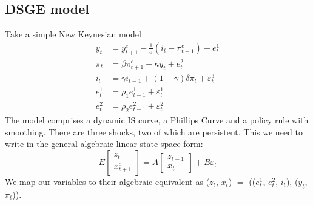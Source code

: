 \documentclass[
  letterpaper,
]{book}
\begin{document}
\hypertarget{dsge-model}{%
\subsection{DSGE model}\label{dsge-model}}

Take a simple New Keynesian model \begin{align}
y_t    &= y_{t+1}^e-\frac{1}{\sigma} (i_t - \pi_{t+1}^e) + e_t^1 \\
\pi_t  &= \beta \pi_{t+1}^e + \kappa y_t + e_t^2 \\
i_t    &= \gamma i_{t-1} + (1-\gamma) \delta \pi_t + \varepsilon_t^3 \\ 
e_t^1  &= \rho_1 e_{t-1}^1 + \varepsilon_t^1 \\ 
e_t^2  &= \rho_2 e_{t-1}^2 + \varepsilon_t^2 
\end{align} The model comprises a dynamic IS curve, a Phillips Curve and
a policy rule with smoothing. There are three shocks, two of which are
persistent. This we need to write in the general algebraic linear
state-space form: \[
E\begin{bmatrix} z_t \\ x_{t+1}^e \end{bmatrix} = A \begin{bmatrix} z_{t-1} \\ x_t \end{bmatrix} + B \varepsilon_t  
\] We map our variables to their algebraic equivalent as (\(z_t\),
\(x_t\)) \(=\) ((\(e^1_t\), \(e^2_t\), \(i_t\)), (\(y_t\), \(\pi_t\))).
\end{document}
